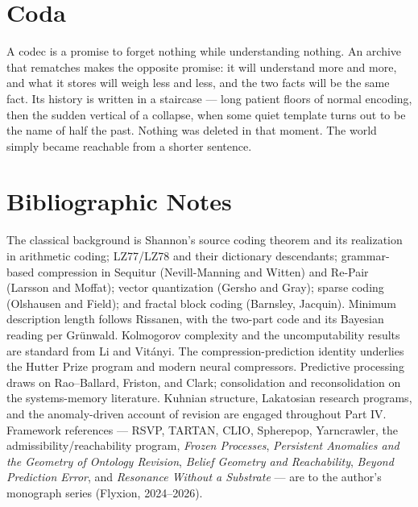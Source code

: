 \documentclass[11pt,oneside]{book}
\theoremstyle{remark}
\begin{document}
\chapter*{Coda}

A codec is a promise to forget nothing while understanding nothing. An
archive that rematches makes the opposite promise: it will understand
more and more, and what it stores will weigh less and less, and the two
facts will be the same fact. Its history is written in a staircase ---
long patient floors of normal encoding, then the sudden vertical of a
collapse, when some quiet template turns out to be the name of half the
past. Nothing was deleted in that moment. The world simply became
reachable from a shorter sentence.

\backmatter

\chapter{Bibliographic Notes}

The classical background is Shannon's source coding theorem and its
realization in arithmetic coding; LZ77/LZ78 and their dictionary
descendants; grammar-based compression in Sequitur (Nevill-Manning and
Witten) and Re-Pair (Larsson and Moffat); vector quantization (Gersho
and Gray); sparse coding (Olshausen and Field); and fractal block coding
(Barnsley, Jacquin). Minimum description length follows Rissanen, with
the two-part code and its Bayesian reading per Grünwald. Kolmogorov
complexity and the uncomputability results are standard from Li and
Vitányi. The compression-prediction identity underlies the Hutter Prize
program and modern neural compressors. Predictive processing draws on
Rao--Ballard, Friston, and Clark; consolidation and reconsolidation on
the systems-memory literature. Kuhnian structure, Lakatosian research
programs, and the anomaly-driven account of revision are engaged
throughout Part IV. Framework references --- RSVP, TARTAN, CLIO,
Spherepop, Yarncrawler, the admissibility/reachability program,
\emph{Frozen Processes}, \emph{Persistent Anomalies and the Geometry of
Ontology Revision}, \emph{Belief Geometry and Reachability},
\emph{Beyond Prediction Error}, and \emph{Resonance Without a
Substrate} --- are to the author's monograph series (Flyxion,
2024--2026).
\end{document}
